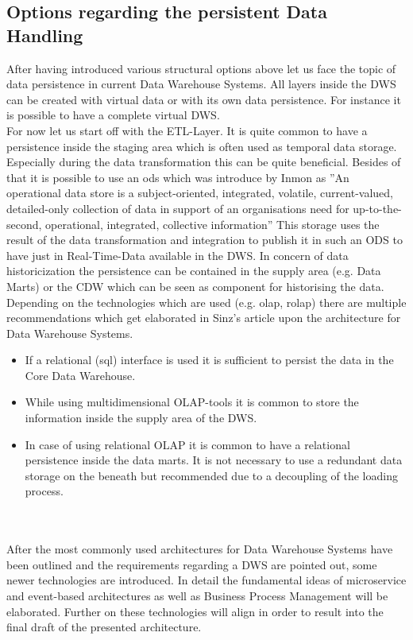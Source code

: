 \subsection{Options regarding the persistent Data Handling}
After having introduced various structural options above let us face the topic of data persistence in current Data Warehouse Systems.
All layers inside the DWS can be created with virtual data or with its own data persistence. For instance it is possible to have a complete virtual DWS.\cite{sinz}\newline
\\
For now let us start off with the ETL-Layer. It is quite common to have a persistence inside the staging area which is often used as temporal data storage. Especially during the data transformation this can be quite beneficial. Besides of that it is possible to use an \acrfull{ods} which was introduce by Inmon as ''An operational data store is a subject-oriented, integrated, volatile, current-valued, detailed-only collection of data in support of an organisations need for up-to-the-second, operational, integrated, collective information''\cite{buildingTheDWS} This storage uses the result of the data transformation and integration to publish it in such an ODS to have just in Real-Time-Data available in the DWS.\newline
In concern of data historicization the persistence can be contained in the supply area (e.g. Data Marts) or the CDW which can be seen as component for historising the data. Depending on the technologies which are used (e.g. \acrshort{olap}, \acrshort{rolap}) there are multiple recommendations which get elaborated in Sinz's article upon the architecture for Data Warehouse Systems.
\begin{itemize}
    \item If a relational (\acrshort{sql}) interface is used it is sufficient to persist the data in the Core Data Warehouse.
    \item While using multidimensional OLAP-tools it is common to store the information inside the supply area of the DWS.
    \item In case of using relational OLAP it is common to have a relational persistence inside the data marts. It is not necessary to use a redundant data storage on the beneath but recommended due to a decoupling of the loading process. 
\end{itemize}
\cite{sinz}
\\
\\
After the most commonly used architectures for Data Warehouse Systems have been outlined and the requirements regarding a DWS are pointed out, some newer technologies are introduced. In detail the fundamental ideas of microservice and event-based architectures as well as Business Process Management will be elaborated. Further on these technologies will align in order to result into the final draft of the presented architecture.